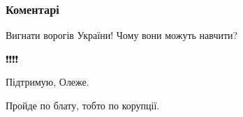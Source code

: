  
 
 
 
 
\subsubsection{Коментарі}
\label{sec:29_01_2021.fb.helgiv_oleg.1.bilchenko.cmt}

\begin{itemize}
 
Вигнати ворогів України! Чому вони можуть навчити?

 
❗❗❗❗

 
Підтримую, Олеже.


 
Пройде по блату, тобто по корупції.

 

\end{itemize}
